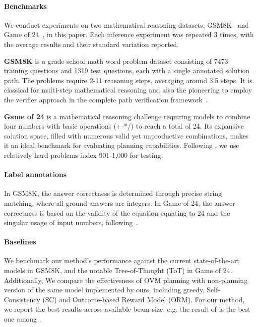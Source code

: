 \documentclass[11pt]{article}
\theoremstyle{plain}
\theoremstyle{claim}
\theoremstyle{rethinking}
\theoremstyle{researchquestion}
\theoremstyle{findings}
\theoremstyle{fact}
\theoremstyle{proper}
\theoremstyle{remark}
\begin{document}
\paragraph{Benchmarks} We conduct experiments on two mathematical reasoning datasets, GSM8K~\citep{gsm8k21} and Game of 24~\citep{tot23}, in this paper. Each inference experiment was repeated 3 times, with the average results and their standard variation reported.

\textbf{GSM8K} is a grade school math word problem dataset consisting of 7473 training questions and 1319 test questions, each with a single annotated solution path. The problems require 2-11 reasoning steps, averaging around 3.5 steps. It is classical for multi-step mathematical reasoning and also the pioneering to employ the verifier approach in the complete path verification framework~\citep{gsm8k21}. 

\textbf{Game of 24} is a mathematical reasoning challenge requiring models to combine four numbers with basic operations (+-*/) to reach a total of 24. Its expansive solution space, filled with numerous valid yet unproductive combinations, makes it an ideal benchmark for evaluating planning capabilities. Following \citet{tot23}, we use relatively hard problems index 901-1,000 for testing. 



\paragraph{Label annotations} In GSM8K, the answer correctness is determined through precise string matching, where all ground answers are integers. In Game of 24, the answer correctness is based on the validity of the equation equating to 24 and the singular usage of input numbers, following~\citep{tot23}. 








\paragraph{Baselines} We benchmark our method's performance against the current state-of-the-art models in GSM8K, and the notable Tree-of-Thought (ToT) in Game of 24. Additionally, We compare the effectiveness of OVM planning with non-planning version of the same model implemented by ours, including greedy, Self-Consistency (SC) and Outcome-based Reward Model (ORM). For our method, we report the best results across available beam size, e.g. the result of  is the best one among .
\end{document}
